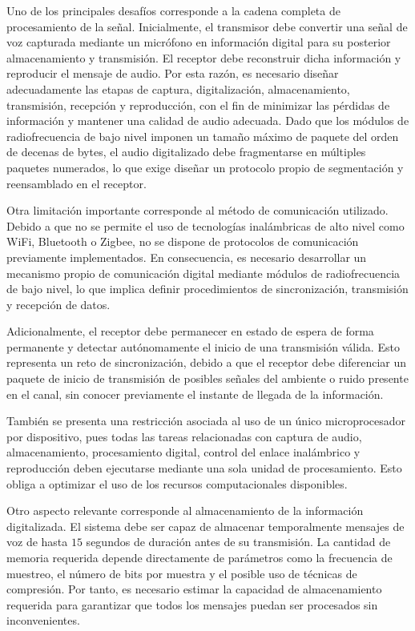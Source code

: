 Uno de los principales desafíos corresponde a la cadena completa de procesamiento de la señal.
Inicialmente, el transmisor debe convertir una señal de voz capturada mediante un micrófono en información digital para su posterior almacenamiento y transmisión.
El receptor debe reconstruir dicha información y reproducir el mensaje de audio.
Por esta razón, es necesario diseñar adecuadamente las etapas de captura, digitalización, almacenamiento, transmisión, recepción y reproducción, con el fin de minimizar las pérdidas de información y mantener una calidad de audio adecuada.
Dado que los módulos de radiofrecuencia de bajo nivel imponen un tamaño máximo de paquete del orden de decenas de bytes, el audio digitalizado debe fragmentarse en múltiples paquetes numerados, lo que exige diseñar un protocolo propio de segmentación y reensamblado en el receptor.

Otra limitación importante corresponde al método de comunicación utilizado.
Debido a que no se permite el uso de tecnologías inalámbricas de alto nivel como WiFi, Bluetooth o Zigbee, no se dispone de protocolos de comunicación previamente implementados.
En consecuencia, es necesario desarrollar un mecanismo propio de comunicación digital mediante módulos de radiofrecuencia de bajo nivel, lo que implica definir procedimientos de sincronización, transmisión y recepción de datos.

Adicionalmente, el receptor debe permanecer en estado de espera de forma permanente y detectar autónomamente el inicio de una transmisión válida.
Esto representa un reto de sincronización, debido a que el receptor debe diferenciar un paquete de inicio de transmisión de posibles señales del ambiente o ruido presente en el canal, sin conocer previamente el instante de llegada de la información.

También se presenta una restricción asociada al uso de un único microprocesador por dispositivo, pues todas las tareas relacionadas con captura de audio, almacenamiento, procesamiento digital, control del enlace inalámbrico y reproducción deben ejecutarse mediante una sola unidad de procesamiento.
Esto obliga a optimizar el uso de los recursos computacionales disponibles.

Otro aspecto relevante corresponde al almacenamiento de la información digitalizada.
El sistema debe ser capaz de almacenar temporalmente mensajes de voz de hasta $15$ segundos de duración antes de su transmisión.
La cantidad de memoria requerida depende directamente de parámetros como la frecuencia de muestreo, el número de bits por muestra y el posible uso de técnicas de compresión.
Por tanto, es necesario estimar la capacidad de almacenamiento requerida para garantizar que todos los mensajes puedan ser procesados sin inconvenientes.

